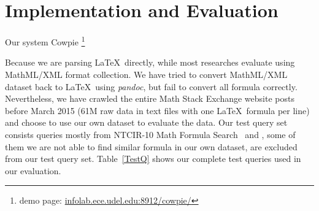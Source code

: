\chapter{Implementation and Evaluation}

Our system Cowpie \footnote{demo page: \url{infolab.ece.udel.edu:8912/cowpie/}}

Because we are parsing \LaTeX\ directly, while most researches evaluate using MathML/XML format collection. We have tried to convert MathML/XML dataset back to \LaTeX\ using \textit{pandoc}, but fail to convert all formula correctly. 
Nevertheless, we have crawled the entire Math Stack Exchange website posts before March 2015 (61M raw data in text files with one \LaTeX\ formula per line) and choose to use our own dataset to evaluate the data.
Our test query set consists queries mostly from NTCIR-10 Math Formula Search~\cite{ntcirtopic} and \cite{symbolpairs15}, some of them we are not able to find similar formula in our own dataset, are excluded from our test query set.
Table~\ref{TestQ} shows our complete test queries used in our evaluation. 

